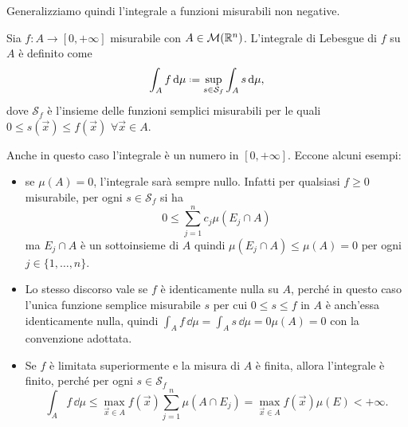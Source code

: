 Generalizziamo quindi l'integrale a funzioni misurabili non negative.
\begin{definizione} \label{d:integrale-lebesgue-funzioni-nonnegative}
	Sia $f\colon A\to[0,+\infty]$ misurabile con $A\in\mathcal M(\mathbb{R}^n)$.
	L'integrale di Lebesgue di $f$ su $A$ è definito come
	\begin{equation}
		\int_Af\,\dd\mu\defeq \sup_{s\in\mathcal S_f}\int_As\,\dd\mu,
		\label{eq:integrale-lebesgue-funzioni-nonnegative}
	\end{equation}
	dove $\mathcal S_f$ è l'insieme delle funzioni semplici misurabili per le quali $0\leq s(\vec x)\leq f(\vec x)$ $\forall\vec x\in A$.
\end{definizione}
Anche in questo caso l'integrale è un numero in $[0,+\infty]$.
Eccone alcuni esempi:
\begin{itemize}
	\item se $\mu(A)=0$, l'integrale sarà sempre nullo.
		Infatti per qualsiasi $f\geq 0$ misurabile, per ogni $s\in\mathcal S_f$ si ha
		\begin{equation}
			0\leq \sum_{j=1}^nc_j\mu(E_j\cap A)
		\end{equation}
		ma $E_j\cap A$ è un sottoinsieme di $A$ quindi $\mu(E_j\cap A)\leq\mu(A)=0$ per ogni $j\in\{1,\dots,n\}$.
	\item Lo stesso discorso vale se $f$ è identicamente nulla su $A$, perch\'e in questo caso l'unica funzione semplice misurabile $s$ per cui $0\leq s\leq f$ in $A$ è anch'essa identicamente nulla, quindi $\int_Af\,\dd\mu=\int_As\,\dd\mu=0\mu(A)=0$ con la convenzione adottata.
	\item Se $f$ è limitata superiormente e la misura di $A$ è finita, allora l'integrale è finito, perch\'e per ogni $s\in\mathcal S_f$
		\begin{equation}
			\int_Af\,\dd\mu\leq\max_{\vec x\in A}f(\vec x)\sum_{j=1}^n\mu(A\cap E_j)=\max_{\vec x\in A}f(\vec x)\mu(E)<+\infty.
		\end{equation}
\end{itemize}

